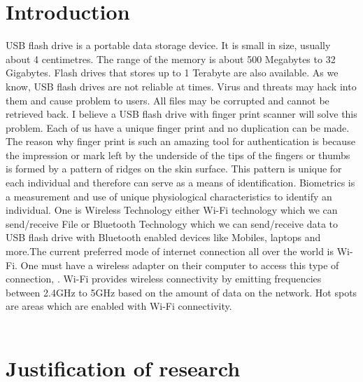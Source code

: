 \documentclass[a4paper,12pt]{article}
\begin{document}
\section{Introduction}
USB flash drive is a portable data storage device. It is small in size, usually about
4 centimetres. The range of the memory is about 500 Megabytes to 32 Gigabytes. 
Flash drives that stores up to 1 Terabyte are also available. As we know, USB flash drives
are not reliable at times. Virus and threats may hack into them and cause problem to users.
All files may be corrupted and cannot be retrieved back. I believe a USB flash drive with finger 
print scanner will solve this problem. Each of us have a unique finger print and no duplication
can be made. The reason why finger print is such an amazing tool for authentication is because the impression or mark left by the underside of the tips of the fingers or thumbs is formed by a pattern of ridges on the skin surface. This pattern is unique for each individual and therefore can serve as a means of identification. Biometrics is a measurement and use of unique physiological characteristics to identify 
an individual. One is Wireless Technology either Wi-Fi technology which we can send/receive File or Bluetooth Technology which we can send/receive data to USB flash drive with
Bluetooth enabled devices like Mobiles, laptops and more.The current preferred mode of internet connection all over the world is Wi-Fi. One must have a wireless adapter on their computer to access this type of connection, . Wi-Fi provides wireless connectivity by emitting frequencies between 2.4GHz to 5GHz based on the amount of data on the network. Hot spots are areas which are enabled with Wi-Fi connectivity. 
\\
\\
\section{Justification of research}
\end{document}
